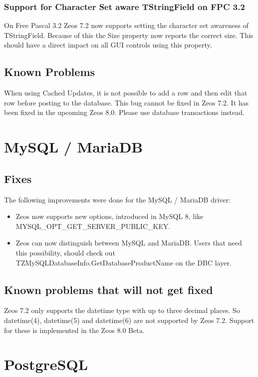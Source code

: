 \documentclass[a4paper,12pt,oneside]{book}
\begin{document}
\subsubsection{Support for Character Set aware TStringField on FPC 3.2}
\label{sec:Rev8_General_Features_TSTringField}
On Free Pascal 3.2 Zeos 7.2 now supports setting the character set awareness of TStringField.
Because of this the Size property now reports the correct size.
This should have a direct impact on all GUI controls using this property.

\subsection{Known Problems}
When using Cached Updates, it is not possible to add a row and then edit that row before posting to the database.
This bug cannot be fixed in Zeos 7.2.
It has been fixed in the upcoming Zeos 8.0.
Please use database transactions instead.

\section{MySQL / MariaDB}
\subsection{Fixes}
The following improvements were done for the MySQL / MariaDB driver:
\begin{itemize}
\item Zeos now supports new options, introduced in MySQL 8, like MYSQL\_\-OPT\_\-GET\_\-SERVER\_\-PUBLIC\_\-KEY.
\item Zeos can now distinguish between MySQL and MariaDB. Users that need this possibility, should check out TZMySQL\-Database\-Info.\-Get\-Database\-Product\-Name on the DBC layer.
\end{itemize}

\subsection{Known problems that will not get fixed}
Zeos 7.2 only supports the datetime type with up to three decimal places.
So datetime(4), datetime(5) and datetime(6) are not supported by Zeos 7.2.
Support for these is implemented in the Zeos 8.0 Beta.

\section{PostgreSQL}
\end{document}
